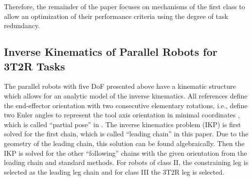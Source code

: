 \documentclass[robotics,article,accept,moreauthors,pdftex]{Definitions/mdpi}
\begin{document}
Therefore, the remainder of the paper focuses on mechanisms of the first class to allow an optimization of their performance criteria using the degree of task redundancy.


\subsection{Inverse Kinematics of Parallel Robots for 3T2R Tasks}

The parallel robots with five DoF presented above have a kinematic structure\deleted[id=Sp]{,} which allows for an analytic model of the inverse kinematics.
All references define the end-effector orientation with two consecutive elementary rotations, i.e., define two Euler angles to represent the tool axis orientation in minimal coordinates \cite{LiuXuYaoXu2015, MerletPerDan2000, WenQinZhaLam2016, ZhengGaoZha2005,GaoSunZha2004, ChengWanZha2008, AlaghebandMahMilBen2015, Tale-MasoulehSaaGosTag2010, BaerWei2006, Tale-MasoulehGos2011}, which is called ``partial pose'' in \cite{MerletPerDan2000}.
The inverse kinematics problem (IKP) is first solved for the first chain, which is called ``leading chain'' in this paper.
Due to the geometry of the leading chain, this solution can be found algebraically. %
Then the IKP is solved for the other ``following'' chains with the given orientation from the leading chain and standard methods.
For robots of class II, the constraining leg is selected as the leading leg chain and for class III the 3T2R leg is selected. %
\end{document}
